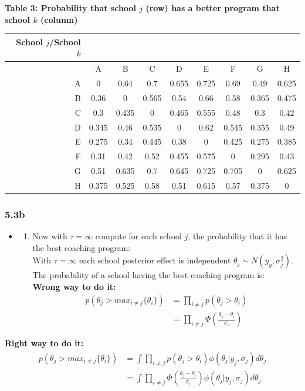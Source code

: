 \documentclass[]{article}
\providecommand{\tightlist}{%
  \setlength{\itemsep}{0pt}\setlength{\parskip}{0pt}}
\begin{document}
\pagebreak

\textbf{Table 3: Probability that school \(j\) (row) has a better
program that school \(k\) (column)}

\begin{longtable}[]{@{}rcccccccc@{}}
\toprule
School \(j\)/School \(k\) & & & & & & & &\tabularnewline
\midrule
\endhead
& A & B & C & D & E & F & G & H\tabularnewline
A & 0 & 0.64 & 0.7 & 0.655 & 0.725 & 0.69 & 0.49 & 0.625\tabularnewline
B & 0.36 & 0 & 0.565 & 0.54 & 0.66 & 0.58 & 0.365 & 0.475\tabularnewline
C & 0.3 & 0.435 & 0 & 0.465 & 0.555 & 0.48 & 0.3 & 0.42\tabularnewline
D & 0.345 & 0.46 & 0.535 & 0 & 0.62 & 0.545 & 0.355 &
0.49\tabularnewline
E & 0.275 & 0.34 & 0.445 & 0.38 & 0 & 0.425 & 0.275 &
0.385\tabularnewline
F & 0.31 & 0.42 & 0.52 & 0.455 & 0.575 & 0 & 0.295 & 0.43\tabularnewline
G & 0.51 & 0.635 & 0.7 & 0.645 & 0.725 & 0.705 & 0 &
0.625\tabularnewline
H & 0.375 & 0.525 & 0.58 & 0.51 & 0.615 & 0.57 & 0.375 &
0\tabularnewline
\bottomrule
\end{longtable}

\subsubsection{5.3b}\label{b-2}

\begin{itemize}
\item
  \begin{enumerate}
  \def\labelenumi{(\roman{enumi})}
  \tightlist
  \item
    Now with \(\tau = \infty\) compute for each school \(j\), the
    probability that it has the best coaching program:\\
    With \(\tau = \infty\) each school posterior effect is independent
    \(\theta_{j} \sim N(y_{y}, \sigma_{j}^{2})\). The probability of a
    school having the best coaching program is:\\
    \textbf{Wrong way to do it:}\\
    \[
    \begin{aligned}  
    p(\theta_{j}>max_{i\neq j}\{\theta_{i}\}) &= \prod_{i\neq j} p(\theta_{j}>\theta_{i}) \\
                                      &= \prod_{i\neq j} \Phi(\frac{\theta_{j} - \theta_{i}}{\sigma_{i}})  
    \end{aligned}
    \]
  \end{enumerate}
\end{itemize}

\textbf{Right way to do it:}\\
\[
\begin{aligned}  
p(\theta_{j}>max_{i\neq j}\{\theta_{i}\}) &= \int \prod_{i\neq j} p(\theta_{j}>\theta_{i}) \phi(\theta_{j}|y_{j},\sigma_{j})d\theta_{j} \\
                                          &= \int \prod_{i\neq j} \Phi\left(\frac{\theta_{j} - \theta_{i}}{\sigma_{i}}\right) \phi(\theta_{j}|y_{j},\sigma_{j})d\theta_{j}                               
\end{aligned}
\]
\end{document}
